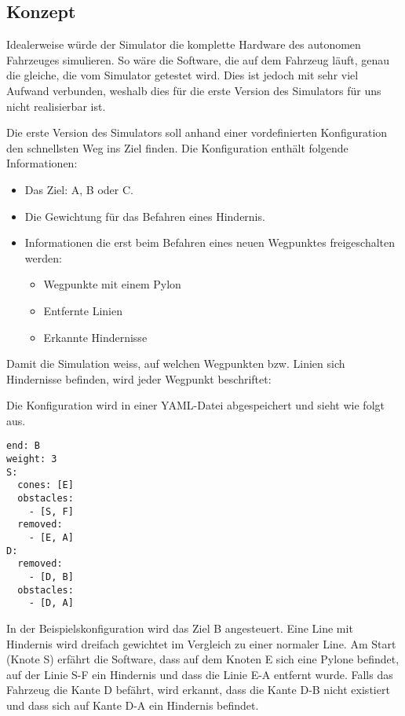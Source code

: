 \documentclass[../main.tex]{subfiles}
\begin{document}
\subsection{Konzept}

Idealerweise würde der Simulator die komplette Hardware des autonomen Fahrzeuges simulieren. So wäre die Software, die auf dem Fahrzeug läuft, genau die gleiche, die vom Simulator getestet wird. Dies ist jedoch mit sehr viel Aufwand verbunden, weshalb dies für die erste Version des Simulators für uns nicht realisierbar ist.

Die erste Version des Simulators soll anhand einer vordefinierten Konfiguration den schnellsten Weg ins Ziel finden. Die Konfiguration enthält folgende Informationen:
\begin{itemize}
    \item Das Ziel: A, B oder C.
    \item Die Gewichtung für das Befahren eines Hindernis.
    \item Informationen die erst beim Befahren eines neuen Wegpunktes freigeschalten werden:
     \begin{itemize}
        \item{Wegpunkte mit einem Pylon}
        \item{Entfernte Linien}
        \item{Erkannte Hindernisse}
   \end{itemize}
\end{itemize}


Damit die Simulation weiss, auf welchen Wegpunkten bzw. Linien sich Hindernisse befinden, wird jeder Wegpunkt beschriftet:


Die Konfiguration wird in einer YAML-Datei abgespeichert und sieht wie folgt aus.

\begin{verbatim}
end: B
weight: 3
S:
  cones: [E]
  obstacles: 
    - [S, F] 
  removed:
    - [E, A]
D:
  removed:
    - [D, B]
  obstacles:
    - [D, A]
\end{verbatim}

In der Beispielskonfiguration wird das Ziel B angesteuert.
Eine Line mit Hindernis wird dreifach gewichtet im Vergleich zu einer normaler Line.  
Am Start (Knote S) erfährt die Software, dass auf dem Knoten E sich eine Pylone befindet,
auf der Linie S-F ein Hindernis und dass die Linie E-A entfernt wurde.
Falls das Fahrzeug die Kante D befährt, wird erkannt, dass die Kante D-B nicht existiert und dass sich auf Kante D-A ein Hindernis befindet.
\end{document}
